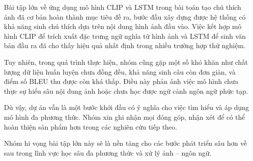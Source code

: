 \documentclass[../main.tex]{subfiles}
\begin{document}
Bài tập lớn về ứng dụng mô hình CLIP và LSTM trong bài toán tạo chú thích ảnh đã cơ bản hoàn thành mục tiêu đề ra, bước đầu xây dựng được hệ thống có khả năng sinh chú thích dựa trên nội dung hình ảnh đầu vào. Việc kết hợp mô hình CLIP để trích xuất đặc trưng ngữ nghĩa từ hình ảnh và LSTM để sinh văn bản đầu ra đã cho thấy hiệu quả nhất định trong nhiều trường hợp thử nghiệm.

Tuy nhiên, trong quá trình thực hiện, nhóm cũng gặp một số khó khăn như chất lượng dữ liệu huấn luyện chưa đồng đều, khả năng sinh câu còn đơn giản, và điểm số BLEU thu được còn khá thấp. Điều này phản ánh việc mô hình chưa thực sự hiểu sâu nội dung ảnh hoặc chưa học được ngữ cảnh ngôn ngữ phức tạp.

Dù vậy, dự án vẫn là một bước khởi đầu có ý nghĩa cho việc tìm hiểu và áp dụng mô hình đa phương thức. Nhóm xin ghi nhận mọi đóng góp, nhận xét để có thể hoàn thiện sản phẩm hơn trong các nghiên cứu tiếp theo.

Nhóm hi vọng bài tập lớn này sẽ là nền tảng cho các bước phát triển sâu hơn về sau trong lĩnh vực học sâu đa phương thức và xử lý ảnh – ngôn ngữ.
\end{document}
